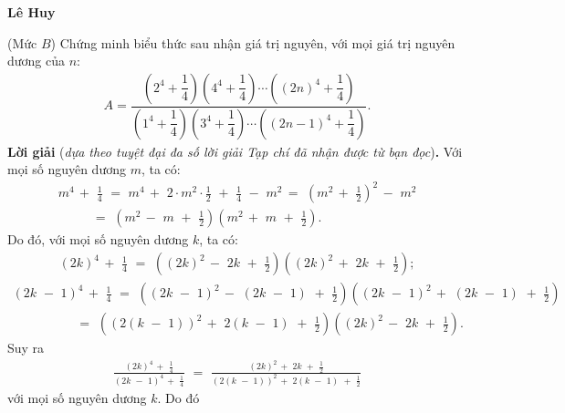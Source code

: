\begin{multicols}{2}
	\begin{flushright}
		\textbf{Lê Huy}
	\end{flushright}
	{}
	(Mức $B$) Chứng minh biểu thức sau nhận giá trị nguyên, với mọi giá trị nguyên dương của $n$:
	\begin{align*}
		A\!=\!\dfrac{\left(2^4\!+\!\dfrac14\right)\!\left(4^4\!+\!\dfrac14\right)\!\cdots\! \left((2n)^4\!+\!\dfrac14\right)}{\left(1^4\!+\!\dfrac14\right)\left(3^4\!+\!\dfrac14\right)\!\cdots\! \left((2n\!-\!1)^4\!+\!\dfrac14\right)}.
	\end{align*}
	\textbf{Lời giải} (\textit{dựa theo tuyệt đại đa số lời giải Tạp chí đã nhận được từ bạn đọc})\textbf{.}
	\vskip 0.05cm
	Với mọi số nguyên dương $m$, ta có:
	\begin{align*}
		{m^4}\, + \,\,\frac{1}{4}\,\, = \,\,{m^4}\, + \,\,2 \cdot {m^2} \cdot \frac{1}{2}\,\, + \,\,\frac{1}{4}\,\, - \,\,{m^2}\, = \,\,{\left( {{m^2}\, + \,\,\frac{1}{2}} \right)^2}\, - \,\,{m^2}\\
		\,\,\,\,\,\,\,\,\,\,\,\,\,\,\,\, = \,\,\left( {{m^2}\, - \,\,m\,\, + \,\,\frac{1}{2}} \right)\left( {{m^2}\, + \,\,m\,\, + \,\,\frac{1}{2}} \right).
	\end{align*}
	Do đó, với mọi số nguyên dương $k$, ta có:
	\begin{align*}
		{\left( {2k} \right)^4}\, + \,\,\frac{1}{4}\,\, = \,\,\left( {{{\left( {2k} \right)}^2}\, - \,\,2k\,\, + \,\,\frac{1}{2}} \right)\left( {{{\left( {2k} \right)}^2}\, + \,\,2k\,\, + \,\,\frac{1}{2}} \right);
	\end{align*}
	\begin{align*}
			{\left( {2k\,\, - \,\,1} \right)^4}\, + \,\,\frac{1}{4}\,\, = \,\,\left( {{{\left( {2k\,\, - \,\,1} \right)}^2}\, - \,\,\left( {2k\,\, - \,\,1} \right)\,\, + \,\,\frac{1}{2}} \right)\left( {{{\left( {2k\,\, - \,\,1} \right)}^2}\, + \,\,\left( {2k\,\, - \,\,1} \right)\,\, + \,\,\frac{1}{2}} \right)\\
			\,\,\,\,\,\,\,\,\,\,\,\,\,\,\,\,\,\,\,\,\,\,\,\,\,\,\,\,\,\, = \,\,\left( {{{\left( {2\left( {k\,\, - \,\,1} \right)} \right)}^2}\, + \,\,2\left( {k\,\, - \,\,1} \right)\,\, + \,\,\frac{1}{2}} \right)\left( {{{\left( {2k} \right)}^2}\, - \,\,2k\,\, + \,\,\frac{1}{2}} \right).
	\end{align*}
	Suy ra
	\begin{align*}
		\frac{{{{\left( {2k} \right)}^4}\, + \,\,\frac{1}{4}}}{{{{\left( {2k\,\, - \,\,1} \right)}^4}\, + \,\,\frac{1}{4}}}\,\, = \,\,\frac{{{{\left( {2k} \right)}^2}\, + \,\,2k\,\, + \,\,\frac{1}{2}}}{{{{\left( {2\left( {k\,\, - \,\,1} \right)} \right)}^2}\, + \,\,2\left( {k\,\, - \,\,1} \right)\,\, + \,\,\frac{1}{2}}}
	\end{align*}
	với mọi số nguyên dương $k$.
	\vskip 0.05cm
	Do đó
	

\end{multicols}
